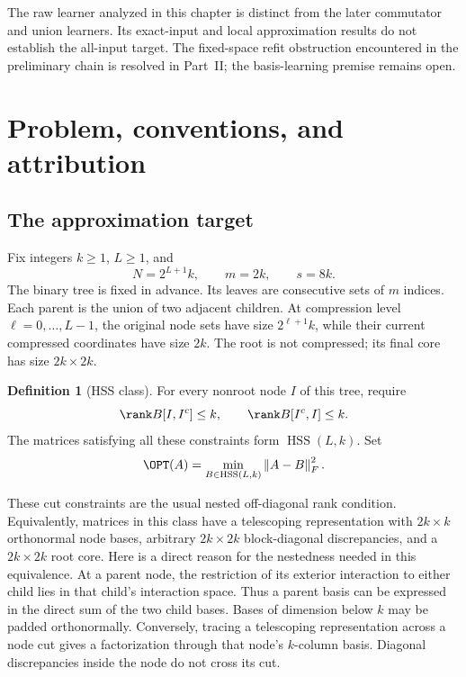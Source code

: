 \documentclass[11pt,oneside,openany,a4paper]{book}
\numberwithin{equation}{chapter}
\theoremstyle{definition}
\newtheorem{definition}[theorem]{Definition}
\theoremstyle{remark}
\newcommand{\F}[1]{\left\lVert#1\right\rVert_F}
\DeclareMathOperator{\HSS}{HSS}\DeclareMathOperator{\dist}{dist}
\begin{document}
\begin{scopebox}
The raw learner analyzed in this chapter is distinct from the later commutator and union learners. Its exact-input and local approximation results do not establish the all-input target. The fixed-space refit obstruction encountered in the preliminary chain is resolved in Part~II; the basis-learning premise remains open.
\end{scopebox}
\section{Problem, conventions, and attribution}\label{base:sec:model}
\subsection{The approximation target}
Fix integers $k\ge1$, $L\ge1$, and
\begin{equation}\label{base:eq:dimensions}
 N=2^{L+1}k,\qquad m=2k,\qquad s=8k.
\end{equation}
The binary tree is fixed in advance. Its leaves are consecutive sets of
$m$ indices. Each parent is the union of two adjacent children. At
compression level $\ell=0,\ldots,L-1$, the original node sets have size
$2^{\ell+1}k$, while their current compressed coordinates have size $2k$.
The root is not compressed; its final core has size $2k\times2k$.

\begin{definition}[HSS class]
For every nonroot node $I$ of this tree, require
\begin{equation}\label{base:eq:cut-ranks}
 \rank B[I,I^c]\le k,\qquad \rank B[I^c,I]\le k.
\end{equation}
The matrices satisfying all these constraints form $\HSS(L,k)$.
Set
\begin{equation}\label{base:eq:opt}
 \OPT(A)=\min_{B\in\HSS(L,k)}\F{A-B}^2.
\end{equation}
\end{definition}
These cut constraints are the usual nested off-diagonal rank condition.
Equivalently, matrices in this class have a telescoping representation with
$2k\times k$ orthonormal node bases, arbitrary $2k\times2k$ block-diagonal
discrepancies, and a $2k\times2k$ root core. Here is a direct reason for the
nestedness needed in this equivalence. At a parent node, the restriction of
its exterior interaction to either child lies in that child's interaction
space. Thus a parent basis can be expressed in the direct sum of the two
child bases. Bases of dimension below $k$ may be padded orthonormally.
Conversely, tracing a telescoping representation across a node cut gives a
factorization through that node's $k$-column basis. Diagonal discrepancies
inside the node do not cross its cut.
\end{document}
